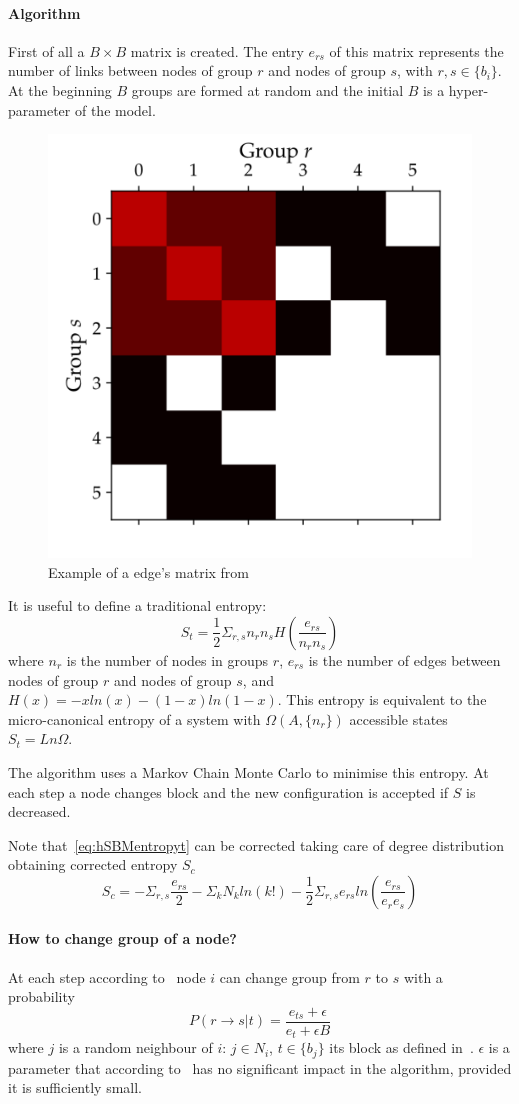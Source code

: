 \paragraph{Algorithm}
First of all a $B\times B$ matrix is created. The entry $e_{rs}$ of this matrix represents the number of links between nodes of group $r$ and nodes of group $s$, with $r,s\in\{b_i\}$. At the beginning $B$ groups are formed at random and the initial $B$ is a hyper-parameter of the model.
\begin{figure}[htb!]
  \centering
  \includegraphics[width=0.3\linewidth]{pictures/topic/peixioto_ers.pdf}
  \caption{Example of a edge's matrix from~\cite{peixoto_graph-tool_2014}}
    \label{fig:hsbm-ers}
\end{figure}

It is useful to define a traditional entropy:
\begin{equation}\label{eq:hSBMentropyt}
  S_t=\frac{1}{2}\Sigma_{r,s} n_rn_sH\left(\frac{e_{rs}}{n_rn_s}\right)
\end{equation}
where $n_{r}$ is the number of nodes in groups $r$, $e_{rs}$ is the
number of edges between nodes of group $r$ and nodes of group $s$, and
$H(x)=-xln(x)-(1-x)ln(1-x)$. This entropy is equivalent to the micro-canonical
entropy of a system with ${\Omega(A,\{n_r\})}$ accessible states $S_t=Ln\Omega$.

The algorithm uses a Markov Chain Monte Carlo to minimise this entropy.
At each step a node changes block and the new configuration is accepted if $S$ is decreased.

Note that~\ref{eq:hSBMentropyt} can be corrected taking care of degree
distribution obtaining corrected entropy $S_c$
\begin{equation}
  S_c=-\Sigma_{r,s}\frac{e_{rs}}{2}-\Sigma_k
  N_kln(k!)-\frac{1}{2}\Sigma_{r,s}e_{rs}ln\left(\frac{e_{rs}}{e_re_s}\right)
\end{equation}

\paragraph{How to change group of a node?}
At each step according to~\cite{peixoto2014efficient} node $i$ can change group from $r$ to $s$ with a probability
\begin{equation}\label{eq:Prst}
  P(r\to s|t)=\frac{e_{ts}+\epsilon}{e_t+\epsilon B}
\end{equation}
where $j$ is a random neighbour of $i$: $j\in N_i$, $t\in\{b_j\}$ its block as defined in~\cite{peixoto2014efficient}.
$\epsilon$ is a parameter that according to~\cite{peixoto2017nonparametric} has no significant impact in the algorithm,
provided it is sufficiently small.


